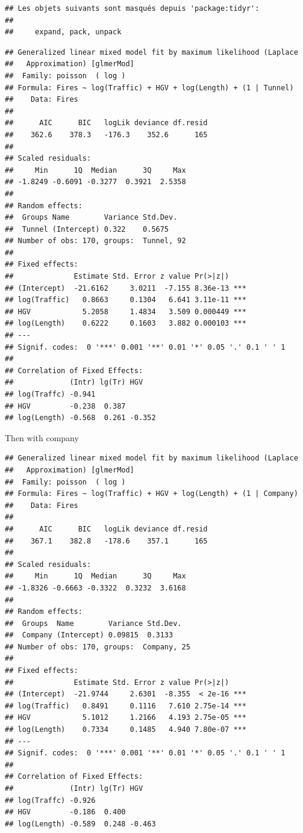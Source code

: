 \documentclass[
]{article}
\begin{document}
\begin{verbatim}
## Les objets suivants sont masqués depuis 'package:tidyr':
## 
##     expand, pack, unpack
\end{verbatim}

\begin{verbatim}
## Generalized linear mixed model fit by maximum likelihood (Laplace
##   Approximation) [glmerMod]
##  Family: poisson  ( log )
## Formula: Fires ~ log(Traffic) + HGV + log(Length) + (1 | Tunnel)
##    Data: Fires
## 
##      AIC      BIC   logLik deviance df.resid 
##    362.6    378.3   -176.3    352.6      165 
## 
## Scaled residuals: 
##     Min      1Q  Median      3Q     Max 
## -1.8249 -0.6091 -0.3277  0.3921  2.5358 
## 
## Random effects:
##  Groups Name        Variance Std.Dev.
##  Tunnel (Intercept) 0.322    0.5675  
## Number of obs: 170, groups:  Tunnel, 92
## 
## Fixed effects:
##              Estimate Std. Error z value Pr(>|z|)    
## (Intercept)  -21.6162     3.0211  -7.155 8.36e-13 ***
## log(Traffic)   0.8663     0.1304   6.641 3.11e-11 ***
## HGV            5.2058     1.4834   3.509 0.000449 ***
## log(Length)    0.6222     0.1603   3.882 0.000103 ***
## ---
## Signif. codes:  0 '***' 0.001 '**' 0.01 '*' 0.05 '.' 0.1 ' ' 1
## 
## Correlation of Fixed Effects:
##             (Intr) lg(Tr) HGV   
## log(Traffc) -0.941              
## HGV         -0.238  0.387       
## log(Length) -0.568  0.261 -0.352
\end{verbatim}

Then with company

\begin{verbatim}
## Generalized linear mixed model fit by maximum likelihood (Laplace
##   Approximation) [glmerMod]
##  Family: poisson  ( log )
## Formula: Fires ~ log(Traffic) + HGV + log(Length) + (1 | Company)
##    Data: Fires
## 
##      AIC      BIC   logLik deviance df.resid 
##    367.1    382.8   -178.6    357.1      165 
## 
## Scaled residuals: 
##     Min      1Q  Median      3Q     Max 
## -1.8326 -0.6663 -0.3322  0.3232  3.6168 
## 
## Random effects:
##  Groups  Name        Variance Std.Dev.
##  Company (Intercept) 0.09815  0.3133  
## Number of obs: 170, groups:  Company, 25
## 
## Fixed effects:
##              Estimate Std. Error z value Pr(>|z|)    
## (Intercept)  -21.9744     2.6301  -8.355  < 2e-16 ***
## log(Traffic)   0.8491     0.1116   7.610 2.75e-14 ***
## HGV            5.1012     1.2166   4.193 2.75e-05 ***
## log(Length)    0.7334     0.1485   4.940 7.80e-07 ***
## ---
## Signif. codes:  0 '***' 0.001 '**' 0.01 '*' 0.05 '.' 0.1 ' ' 1
## 
## Correlation of Fixed Effects:
##             (Intr) lg(Tr) HGV   
## log(Traffc) -0.926              
## HGV         -0.186  0.400       
## log(Length) -0.589  0.248 -0.463
\end{verbatim}
\end{document}
